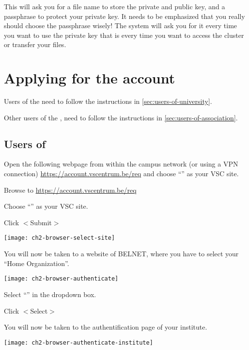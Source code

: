   This will ask you for a file name to store the private and public key, and a
  passphrase to protect your private key. It needs to be emphasized that you
  really should choose the passphrase wisely! The system will ask you for it
  every time you want to use the private key that is every time you want to
  access the cluster or transfer your files.

\fi %

\section{Applying for the account}
\label{sec:applying-for-the-account}

Users of the \university need to follow the instructions in \autoref{sec:users-of-university}.

Other users of the \association, need to follow the instructions in \autoref{sec:users-of-association}.

\subsection{Users of \university}
\label{sec:users-of-university}

Open the following webpage from within the \university campus network (or using a VPN
connection) \url{https://account.vscentrum.be/req} and choose ``\sitename'' as your VSC
site.

Browse to \url{https://account.vscentrum.be/req}

Choose ``\sitename'' as your VSC site.

Click $<$Submit$>$

\texttt{[image: ch2-browser-select-site]}

You will now be taken to a website of BELNET, where you have to select your ``Home Organization''.

\texttt{[image: ch2-browser-authenticate]}

Select ``\university'' in the dropdown box.

Click $<$Select$>$

You will now be taken to the authentification page of your institute.

\ifantwerpen
\texttt{[image: ch2-browser-authenticate-institute]}
\fi

